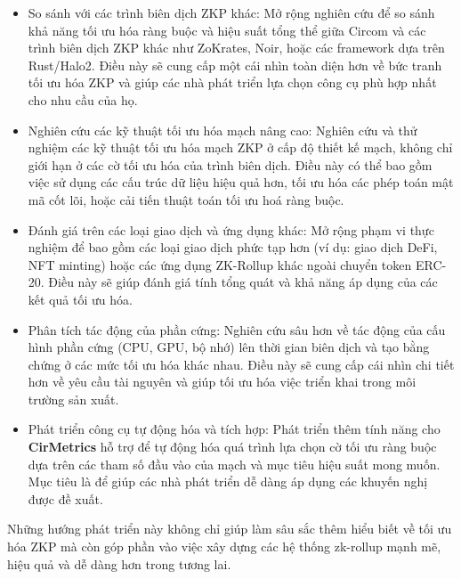 \begin{itemize}
    \item So sánh với các trình biên dịch ZKP khác: Mở rộng nghiên cứu để so sánh khả năng tối ưu hóa ràng buộc và hiệu suất tổng thể giữa Circom và các trình biên dịch ZKP khác như ZoKrates, Noir, hoặc các framework dựa trên Rust/Halo2. Điều này sẽ cung cấp một cái nhìn toàn diện hơn về bức tranh tối ưu hóa ZKP và giúp các nhà phát triển lựa chọn công cụ phù hợp nhất cho nhu cầu của họ.
    \item Nghiên cứu các kỹ thuật tối ưu hóa mạch nâng cao: Nghiên cứu và thử nghiệm các kỹ thuật tối ưu hóa mạch ZKP ở cấp độ thiết kế mạch, không chỉ giới hạn ở các cờ tối ưu hóa của trình biên dịch. Điều này có thể bao gồm việc sử dụng các cấu trúc dữ liệu hiệu quả hơn, tối ưu hóa các phép toán mật mã cốt lõi, hoặc cải tiến thuật toán tối ưu hoá ràng buộc.
    \item Đánh giá trên các loại giao dịch và ứng dụng khác: Mở rộng phạm vi thực nghiệm để bao gồm các loại giao dịch phức tạp hơn (ví dụ: giao dịch DeFi, NFT minting) hoặc các ứng dụng ZK-Rollup khác ngoài chuyển token ERC-20. Điều này sẽ giúp đánh giá tính tổng quát và khả năng áp dụng của các kết quả tối ưu hóa.
    \item Phân tích tác động của phần cứng: Nghiên cứu sâu hơn về tác động của cấu hình phần cứng (CPU, GPU, bộ nhớ) lên thời gian biên dịch và tạo bằng chứng ở các mức tối ưu hóa khác nhau. Điều này sẽ cung cấp cái nhìn chi tiết hơn về yêu cầu tài nguyên và giúp tối ưu hóa việc triển khai trong môi trường sản xuất.
    \item Phát triển công cụ tự động hóa và tích hợp: Phát triển thêm tính năng cho \textbf{CirMetrics} hỗ trợ để tự động hóa quá trình lựa chọn cờ tối ưu ràng buộc dựa trên các tham số đầu vào của mạch và mục tiêu hiệu suất mong muốn. Mục tiêu là để giúp các nhà phát triển dễ dàng áp dụng các khuyến nghị được đề xuất.
\end{itemize}

Những hướng phát triển này không chỉ giúp làm sâu sắc thêm hiểu biết về tối ưu hóa ZKP mà còn góp phần vào việc xây dựng các hệ thống zk-rollup mạnh mẽ, hiệu quả và dễ dàng hơn trong tương lai.

